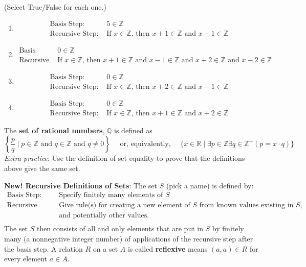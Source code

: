 \documentclass[12pt, oneside]{article}
\begin{document}
(Select True/False for each one.)
\begin{enumerate}
\item 
\[
\begin{array}{ll}
\textrm{Basis Step: } & 5 \in \mathbb{Z} \\
\textrm{Recursive Step: } & \textrm{If } x \in \mathbb{Z} \textrm{, then } x+1 \in \mathbb{Z}
\textrm{ and } x-1 \in \mathbb{Z}
\end{array}
\]
\item 
\[
\begin{array}{ll}
\textrm{Basis Step: } & 0 \in \mathbb{Z} \\
\textrm{Recursive Step: } & \textrm{If } x \in \mathbb{Z} \textrm{, then } x+1 \in \mathbb{Z}
\textrm{ and } x-1 \in \mathbb{Z} \textrm{ and } x+2 \in \mathbb{Z} \textrm{ and } x-2 \in \mathbb{Z}
\end{array}
\]
\item 
\[
\begin{array}{ll}
\textrm{Basis Step: } & 0 \in \mathbb{Z} \\
\textrm{Recursive Step: } & \textrm{If } x \in \mathbb{Z} \textrm{, then } x+2 \in \mathbb{Z}
\textrm{ and } x-1 \in \mathbb{Z}
\end{array}
\]
\item 
\[
\begin{array}{ll}
\textrm{Basis Step: } & 0 \in \mathbb{Z} \\
\textrm{Recursive Step: } & \textrm{If } x \in \mathbb{Z} \textrm{, then } x+1 \in \mathbb{Z}
\textrm{ and } x+2 \in \mathbb{Z}
\end{array}
\]
\end{enumerate}
The {\bf set  of rational numbers}, $\mathbb{Q}$  is defined as 
\[
\left\{ \frac{p}{q} \mid p \in \mathbb{Z}  \text{ and  } q  \in \mathbb{Z} \text{ and } q \neq  0 \right\}
\text{~~~~or, equivalently,~~~~}
\{ x  \in  \mathbb{R} \mid \exists p \in \mathbb{Z}  \exists q \in \mathbb{Z}^+ ( p =  x \cdot q) \}
\]
{\it Extra practice}: Use the definition of set equality to prove that the definitions above  give the same set.

{\bf New! Recursive Definitions of Sets}: The set $S$ (pick a name) is defined by:
\[
\begin{array}{ll}
\textrm{Basis Step: } & \textrm{Specify finitely many elements of } S\\
\textrm{Recursive Step: } & \textrm{Give rule(s) for creating a new element of } S \textrm{ from known values existing in } S, \\
& \textrm{and potentially other values}. \\
\end{array}
\]
The set $S$ then consists of all and only elements that are put in $S$ by finitely many (a nonnegative integer number) of
applications of the recursive step after the basis step.
A relation $R$ on a set $A$ is called {\bf reflexive} 
means $(a, a) \in R$ for every element $a \in A$. 
\end{document}
